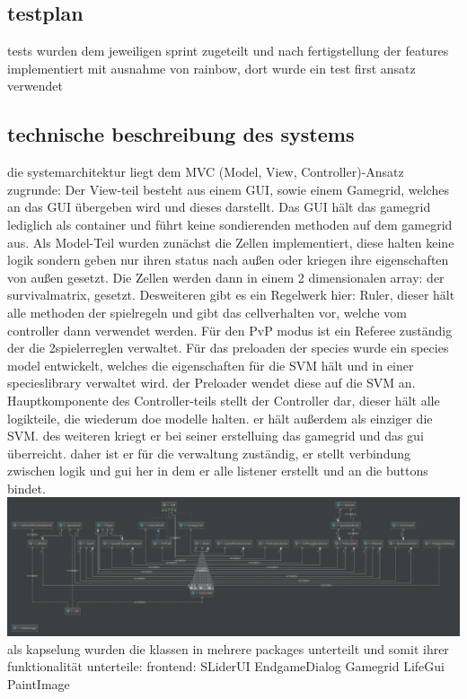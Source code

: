\documentclass[12pt]{article}
\theoremstyle{plain}
\begin{document}
\begin{linenumbers}
\subsection{testplan}

tests wurden dem jeweiligen sprint zugeteilt und nach fertigstellung der features implementiert
mit ausnahme von rainbow, dort wurde ein test first ansatz verwendet

\subsection{technische beschreibung des systems}

die systemarchitektur liegt dem MVC (Model, View, Controller)-Ansatz zugrunde:
Der View-teil besteht aus einem GUI, sowie einem Gamegrid, welches an das GUI übergeben wird und dieses darstellt.
Das GUI hält das gamegrid lediglich als container und führt keine sondierenden methoden auf dem gamegrid aus.
Als Model-Teil wurden zunächst die Zellen implementiert, diese halten keine logik sondern geben nur ihren status nach außen oder kriegen ihre eigenschaften
von außen gesetzt. Die Zellen werden dann in einem 2 dimensionalen array: der survivalmatrix, gesetzt. Desweiteren gibt es ein Regelwerk hier: Ruler,
dieser hält alle methoden der spielregeln und gibt das cellverhalten vor, welche vom controller dann verwendet werden. Für den PvP modus ist ein Referee zuständig der die 2spielerreglen
verwaltet. Für das preloaden der species wurde ein species model entwickelt, welches die eigenschaften für die SVM hält und in einer specieslibrary verwaltet wird. der Preloader wendet diese auf die SVM an.
Hauptkomponente des Controller-teils stellt der Controller dar, dieser hält alle logikteile, die wiederum doe modelle halten. er hält außerdem als einziger die SVM.
des weiteren kriegt er bei seiner erstelluing das gamegrid und das gui überreicht. daher ist er für die verwaltung zuständig, er stellt verbindung zwischen logik und gui her in dem
er alle listener erstellt und an die buttons bindet.
\newline
\includegraphics{images/gogolClasses.png}
\newline
als kapselung wurden die klassen in mehrere packages unterteilt und somit ihrer funktionalität unterteile:
frontend:
SLiderUI
EndgameDialog
Gamegrid
LifeGui
PaintImage


\end{linenumbers}
\end{document}
